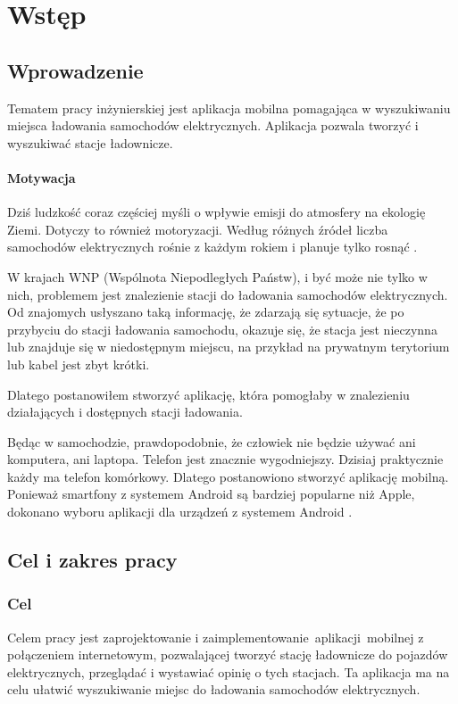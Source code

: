 \chapter{Wstęp}

\section{Wprowadzenie}
Tematem pracy inżynierskiej jest aplikacja mobilna pomagająca w wyszukiwaniu miejsca ładowania samochodów elektrycznych.
Aplikacja pozwala tworzyć i wyszukiwać stacje ładownicze.

\subsubsection{Motywacja}
Dziś ludzkość coraz częściej myśli o wpływie emisji do atmosfery na ekologię Ziemi. Dotyczy to również motoryzacji.
Według różnych źródeł liczba samochodów elektrycznych rośnie z każdym rokiem i planuje tylko rosnąć \cite{iea1,mam1}.

W krajach WNP (Wspólnota Niepodległych Państw), i być może nie tylko w nich, problemem jest znalezienie stacji do ładowania samochodów elektrycznych. Od znajomych usłyszano taką informację, że zdarzają się sytuacje,
że po przybyciu do stacji ładowania samochodu, okazuje się, że stacja jest nieczynna lub znajduje się w niedostępnym miejscu, na przykład na prywatnym terytorium lub kabel jest zbyt krótki.

Dlatego postanowiłem stworzyć aplikację, która pomogłaby w znalezieniu działających i dostępnych stacji ładowania.

Będąc w samochodzie, prawdopodobnie, że człowiek nie będzie używać ani komputera, ani laptopa. Telefon jest znacznie wygodniejszy. Dzisiaj praktycznie każdy ma telefon komórkowy.
Dlatego postanowiono stworzyć aplikację mobilną. Ponieważ smartfony z systemem Android są bardziej popularne niż Apple, dokonano wyboru aplikacji dla urządzeń z systemem Android \cite{avi1}.


\section{Cel i zakres pracy}
\subsection{Cel}
Celem pracy jest zaprojektowanie i zaimplementowanie aplikacji mobilnej z połączeniem internetowym,
pozwalającej tworzyć stację ładownicze do pojazdów elektrycznych, przeglądać i wystawiać opinię o tych stacjach.
Ta aplikacja ma na celu ułatwić wyszukiwanie miejsc do ładowania samochodów elektrycznych.

